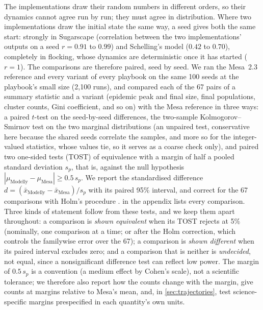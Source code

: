 The implementations draw their random numbers in different orders, so their dynamics cannot
agree run by run; they must agree in distribution. Where two implementations draw the initial
state the same way, a seed gives both the same start: strongly in Sugarscape (correlation
between the two implementations' outputs on a seed $r = 0.91$ to $0.99$) and Schelling's model
($0.42$ to $0.70$), completely in flocking, whose dynamics are deterministic once it has
started ($r = 1$). The comparisons are therefore paired, seed by seed. We ran the Mesa~2.3
reference and every \modelly{} variant of every playbook on the same 100 seeds at the playbook's
small size (2,100 runs), and compared each of the 67 pairs of a summary statistic and a \modelly{} variant (epidemic peak
and final size, final populations, cluster counts, Gini coefficient, and so on) with the Mesa
reference in three ways: a paired $t$-test on the seed-by-seed differences, the two-sample
Kolmogorov--Smirnov test on the two marginal distributions (an unpaired test, conservative
here because the shared seeds correlate the samples, and more so for the integer-valued
statistics, whose values tie, so it serves as a coarse check only), and paired two one-sided tests
(TOST) of equivalence \citep{schuirmann1987comparison, lakens2017equivalence} with a margin of
half a pooled standard deviation $s_p$, that is, against the null hypothesis
$|\mu_{\mathrm{Modelly}} - \mu_{\mathrm{Mesa}}| \ge 0.5\, s_p$. We report the standardised
difference $d = (\bar x_{\mathrm{Modelly}} - \bar x_{\mathrm{Mesa}}) / s_p$ with its paired 95\%
interval, and correct for the 67 comparisons with Holm's procedure \citep{holm1979simple}.
 in the appendix lists every comparison. Three kinds of statement
follow from these tests, and we keep them apart throughout: a comparison is \emph{shown
equivalent} when its TOST rejects at 5\% (nominally, one comparison at a time; or after the
Holm correction, which controls the familywise error over the 67); a comparison is
\emph{shown different} when its paired interval excludes zero; and a comparison that is
neither is \emph{undecided}, not equal, since a nonsignificant difference test can reflect
low power. The margin of $0.5\,s_p$ is a convention (a medium effect by Cohen's scale), not
a scientific tolerance; we therefore also report how the counts change with the margin,
give counts at margins relative to Mesa's mean, and, in \cref{sec:trajectories}, test
science-specific margins prespecified in each quantity's own units.

\begin{table}[htbp]
  \centering
  \small
  \caption{Agreement with Mesa~2.3 over 100 shared seeds per variant, at the small size: the
  largest standardised difference, the lowest paired $t$ and Kolmogorov--Smirnov $p$-values
  (before correction), and the number of statistics equivalent within $0.5\,s_p$ (paired TOST
  at 5\%, uncorrected).
  Generated by .}
  \label{tab:agreement}
  
\end{table}

